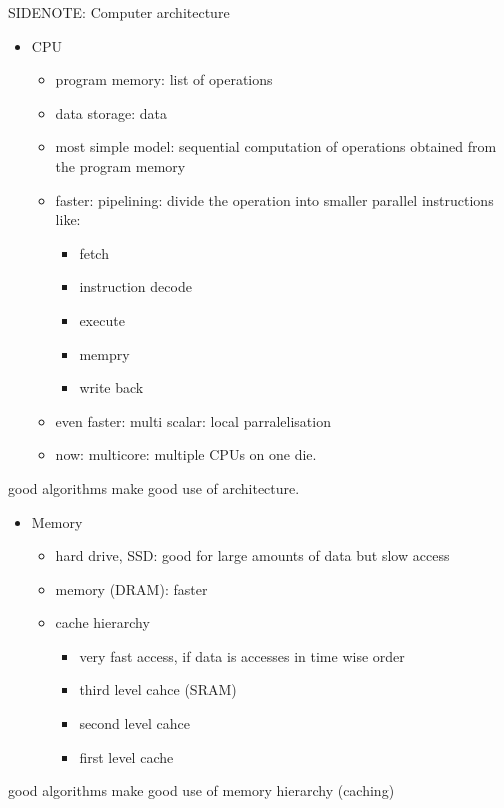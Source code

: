 \documentclass[a4paper]{article}
\begin{document}
SIDENOTE: Computer architecture
\begin{itemize}
    \item CPU
        \begin{itemize}
            \item program memory: list of operations
            \item data storage: data
            \item most simple model: sequential computation of operations obtained from the program memory
            \item faster: pipelining: divide the operation into smaller parallel instructions like:
                \begin{itemize}
                    \item fetch
                    \item instruction decode
                    \item execute
                    \item mempry
                    \item write back
                \end{itemize}
            \item even faster: multi scalar: local parralelisation
            \item now: multicore: multiple CPUs on one die.
        \end{itemize}
\end{itemize}
good algorithms make good use of architecture.
\begin{itemize}
    \item Memory
        \begin{itemize}
            \item hard drive, SSD: good for large amounts of data but slow access
            \item memory (DRAM): faster
            \item cache hierarchy
                \begin{itemize}
                    \item very fast access, if data is accesses in time wise order
                    \item third level cahce (SRAM)
                    \item second level cahce
                    \item first level cache
                \end{itemize}
        \end{itemize}
\end{itemize}
good algorithms make good use of memory hierarchy (caching)
\end{document}

